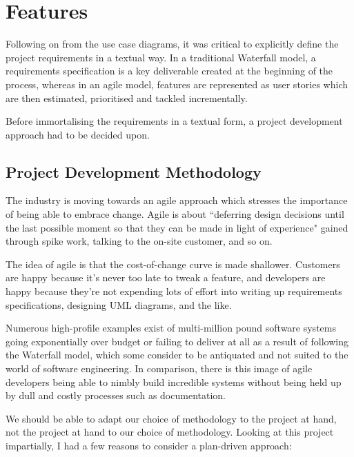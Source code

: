 \section{Features}

Following on from the use case diagrams, it was critical to explicitly define the project requirements in a textual way. In a traditional Waterfall model, a requirements specification is a key deliverable created at the beginning of the process, whereas in an agile model, features are represented as user stories which are then estimated, prioritised and tackled incrementally.

Before immortalising the requirements in a textual form, a project development approach had to be decided upon.

\subsection{Project Development Methodology}

The industry is moving towards an agile approach which stresses the importance of being able to embrace change. Agile is about ``deferring design decisions until the last possible moment so that they can be made in light of experience" gained through spike work, talking to the on-site customer, and so on.~\cite{learningAgile}

The idea of agile is that the cost-of-change curve is made shallower. Customers are happy because it's never too late to tweak a feature, and developers are happy because they're not expending lots of effort into writing up requirements specifications, designing UML diagrams, and the like.

Numerous high-profile examples exist of multi-million pound software systems going exponentially over budget or failing to deliver at all as a result of following the Waterfall model, which some consider to be antiquated and not suited to the world of software engineering. In comparison, there is this image of agile developers being able to nimbly build incredible systems without being held up by dull and costly processes such as documentation.

We should be able to adapt our choice of methodology to the project at hand, not the project at hand to our choice of methodology. Looking at this project impartially, I had a few reasons to consider a plan-driven approach:

